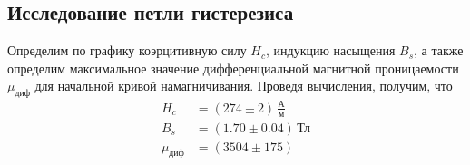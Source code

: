 \documentclass[12pt]{article}
\begin{document}
\subsection*{Исследование петли гистерезиса}
\par
	Определим по графику коэрцитивную силу $H_c$, индукцию насыщения $B_s$, а также определим максимальное значение дифференциальной магнитной проницаемости $\mu_\text{диф}$ для начальной кривой намагничивания. Проведя вычисления, получим, что
\begin{align*}
	H_c &= \left(274 \pm 2\right) \, \frac{\text{А}}{\text{м}} \\ 
	B_s &= \left(1.70 \pm 0.04\right) \, \text{Тл} \\
	\mu_\text{диф} &= \left(3504 \pm 175\right) \\
\end{align*}
\end{document}
